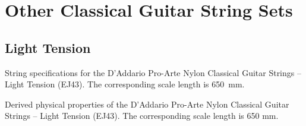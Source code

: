 %
%
%

 \newpage
 \section{Other Classical Guitar String Sets\label{app:specs}}

 \subsection{Light Tension}


 \begin{table}[htbp]
  \centering
  \caption{\label{tbl:ej43_mks} String specifications for the D'Addario Pro-Arte Nylon Classical Guitar Strings -- Light Tension (EJ43). The corresponding scale length is 650~mm.}
  
 \end{table}%

 \begin{table}[htbp]
  \centering
  \caption{\label{tbl:ej43_props} Derived physical properties of the D'Addario Pro-Arte Nylon Classical Guitar Strings -- Light Tension (EJ43). The corresponding scale length is 650 mm.}
  
 \end{table}%

